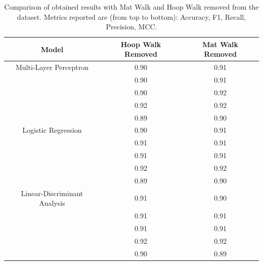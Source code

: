             \begin{table}[htbp]
                \centering
                \begin{tabular}{|c|c|c|}
                \hline
                \textbf{Model} & \textbf{Hoop Walk Removed} & \textbf{Mat Walk Removed} \\ \hline
                    Multi-Layer Perceptron          & 0.90 & 0.91 \\ 
                                                    & 0.90 & 0.91 \\ 
                                                    & 0.90 & 0.92 \\
                                                    & 0.92 & 0.92 \\ 
                                                    & 0.89 & 0.90 \\
                                                    \hline
                    Logistic Regression             & 0.90 & 0.91 \\ 
                                                    & 0.91 & 0.91 \\ 
                                                    & 0.91 & 0.91 \\ 
                                                    & 0.92 & 0.92 \\
                                                    & 0.89 & 0.90 \\
                                                    \hline
                    Linear-Discriminant Analysis    & 0.91 & 0.90 \\ 
                                                    & 0.91 & 0.91 \\ 
                                                    & 0.91 & 0.91 \\ 
                                                    & 0.92 & 0.92 \\
                                                    & 0.90 & 0.89 \\ 
                                                    \hline
                \end{tabular}
                \caption{Comparison of obtained results with Mat Walk and Hoop Walk removed from the dataset. Metrics reported are (from top to bottom): Accuracy, F1, Recall, Precision, MCC.}
                \label{tab:feature_engineering_approach_mat_hoop}
            \end{table}
\newpage
            
